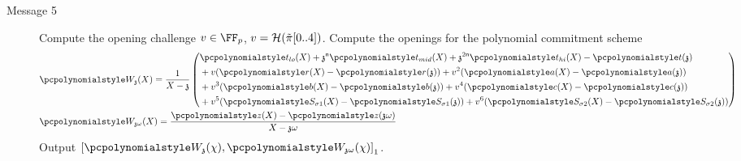 \begin{description}
\item[Message 5] Compute the opening challenge $v \in \FF_p$,
  $v = \mathcal{H}(\tilde{\pi}[0..4])$.  Compute the openings for the polynomial commitment
  scheme
	\begin{align*}
	& \p{W_\chz}(X) = \frac{1}{X - \chz} \left(
   \begin{aligned}
     & \p{t_{lo}}(X) + \chz^\noofc \p{t_{mid}}(X) + \chz^{2 \noofc} \p{t_{hi}}(X) - \p{t}(\chz)\\
     & + v(\p{r}(X) - \p{r}(\chz)) 
      + v^2 (\p{a}(X) - \p{a}(\chz))\\
     & + v^3 (\p{b}(X) - \p{b}(\chz))
      + v^4 (\p{c}(X) - \p{c}(\chz))\\
     & + v^5 (\p{S_{\sigma 1}}(X) - \p{S_{\sigma 1}}(\chz))
      + v^6 (\p{S_{\sigma 2}}(X) - \p{S_{\sigma 2}}(\chz))
   \end{aligned}
       \right)\\
    & \p{W_{\chz \omega}}(X) = \frac{\p{z}(X) - \p{z}(\chz \omega)}{X - \chz \omega}
  \end{align*}
	Output $\gone{\p{W_{\chz}}(\chi), \p{W_{\chz \omega}}(\chi)}$.
\end{description}

